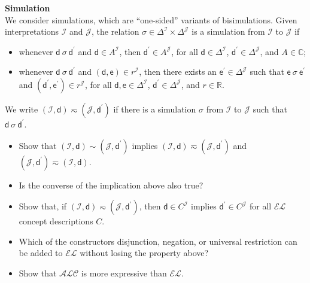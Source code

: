 \documentclass[12pt,a4paper]{article}
\newenvironment{problems}[2][{\color{purple}Question}]{\begin{trivlist}
\item[\hskip \labelsep {\bfseries #1}\hskip \labelsep {\bfseries #2.}]}{\end{trivlist}}
\begin{document}
\begin{problems}{{\color{purple}9 (with 1 bonus mark)}}
\textbf{Simulation}\\
We consider simulations, which are ``one-sided'' variants of bisimulations. Given interpretations $\mathcal{I}$ and $\mathcal{J}$, the relation $\sigma\in\Delta^{\mathcal{I}}\times\Delta^{\mathcal{J}}$ is a simulation from $\mathcal{I}$ to $\mathcal{J}$ if
\begin{itemize}
\item[$\bullet$] whenever $\textsf{d}~\sigma~\textsf{d}^{\prime}$ and $\textsf{d}\in A^{\mathcal{I}}$, then $\textsf{d}^{\prime}\in A^{\mathcal{J}}$, for all $\textsf{d}\in\Delta^{\mathcal{I}}$, $\textsf{d}^{\prime}\in\Delta^{\mathcal{J}}$, and $A\in\mathbb{C}$;
\item[$\bullet$] whenever $\textsf{d}~\sigma~\textsf{d}^{\prime}$ and $(\textsf{d},\textsf{e})\in r^{\mathcal{I}}$, then there exists an $\textsf{e}^{\prime}\in\Delta^{\mathcal{J}}$ such that $\textsf{e}~\sigma~\textsf{e}^{\prime}$ and $(\textsf{d}^{\prime},\textsf{e}^{\prime})\in r^{\mathcal{J}}$, for all $\textsf{d},\textsf{e}\in\Delta^{\mathcal{I}}$, $\textsf{d}^{\prime}\in\Delta^{\mathcal{J}}$, and $r\in\mathbb{R}$.
\end{itemize}
We write $(\mathcal{I},\textsf{d})\eqsim(\mathcal{J},\textsf{d}^{\prime})$ if there is a simulation $\sigma$ from $\mathcal{I}$ to $\mathcal{J}$ such that $\textsf{d}~\sigma~\textsf{d}^{\prime}$.
\begin{itemize}
\item[-] Show that $(\mathcal{I},\textsf{d})\sim(\mathcal{J},\textsf{d}^{\prime})$ implies $(\mathcal{I},\textsf{d})\eqsim(\mathcal{J},\textsf{d}^{\prime})$ and $(\mathcal{J},\textsf{d}^{\prime})\eqsim(\mathcal{I},\textsf{d})$.
\item[-] Is the converse of the implication above also true?
\item[-] Show that, if $(\mathcal{I},\textsf{d})\eqsim(\mathcal{J},\textsf{d}^{\prime})$, then $\textsf{d}\in C^{\mathcal{I}}$ implies $\textsf{d}^{\prime}\in C^{\mathcal{J}}$ for all $\mathcal{EL}$ concept descriptions $C$.
\item[-] Which of the constructors disjunction, negation, or universal restriction can be added to $\mathcal{EL}$ without losing the property above?
\item[-] Show that $\mathcal{ALC}$ is more expressive than $\mathcal{EL}$.
\end{itemize}
\end{problems}
\end{document}
